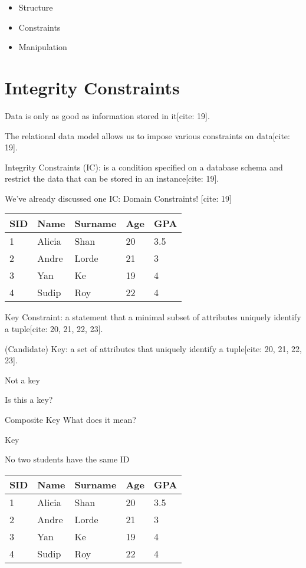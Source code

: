 \documentclass{article}
\begin{document}
\begin{itemize}
    \item Structure
    \item Constraints
    \item Manipulation
\end{itemize}

\section*{Integrity Constraints}

Data is only as good as information stored in it[cite: 19].

The relational data model allows us to impose various constraints on data[cite: 19].

Integrity Constraints (IC): is a condition specified on a database schema and restrict the data that can be stored in an instance[cite: 19].

We've already discussed one IC: Domain Constraints! [cite: 19]

\begin{tabular}{lllll}
\hline
SID & Name & Surname & Age & GPA \\
\hline
1 & Alicia & Shan & 20 & 3.5 \\
2 & Andre & Lorde & 21 & 3 \\
3 & Yan & Ke & 19 & 4 \\
4 & Sudip & Roy & 22 & 4 \\
\hline
\end{tabular}

Key Constraint: a statement that a minimal subset of attributes uniquely identify a tuple[cite: 20, 21, 22, 23].

(Candidate) Key: a set of attributes that uniquely identify a tuple[cite: 20, 21, 22, 23].

Not a key

Is this a key?

Composite Key What does it mean?

Key

No two students have the same ID

\begin{tabular}{lllll}
\hline
SID & Name & Surname & Age & GPA \\
\hline
1 & Alicia & Shan & 20 & 3.5 \\
2 & Andre & Lorde & 21 & 3 \\
3 & Yan & Ke & 19 & 4 \\
4 & Sudip & Roy & 22 & 4 \\
\hline
\end{tabular}
\end{document}
